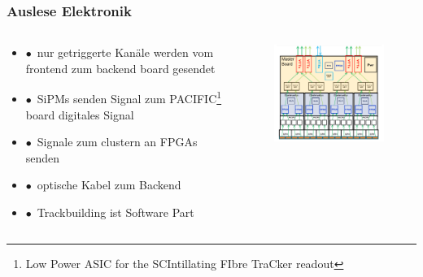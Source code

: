 \documentclass[aspectratio=1610, 12pt, xcolor=dvipsnames]{beamer}
\begin{document}
\begin{frame}\frametitle{Auslese Elektronik}
  \begin{columns}
    \begin{column}[c]{0.48\textwidth}
      \begin{itemize}
        \item $\bullet$\, nur getriggerte Kanäle werden vom frontend zum backend board gesendet
        \item $\bullet$\, SiPMs senden Signal zum PACIFIC\footnote{Low Power ASIC for the SCIntillating FIbre TraCker readout} board \to digitales Signal
        \item $\bullet$\, Signale zum clustern an FPGAs senden
        \item $\bullet$\, optische Kabel zum Backend
        \item $\bullet$\, Trackbuilding ist Software Part
      \end{itemize}
    \end{column}
    \begin{column}[c]{0.48\textwidth}
      \begin{figure}
        \centering
        \includegraphics[width=\textwidth]{plots/readout.png}
      \end{figure}
    \end{column}
  \end{columns}
\end{frame}
\end{document}
